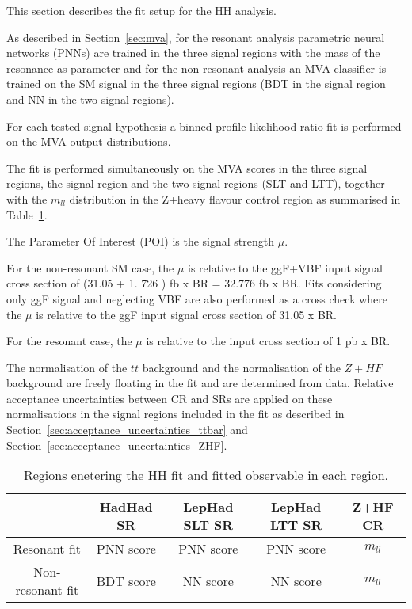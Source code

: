 This section describes the fit setup for the HH analysis.

As described in Section~\ref{sec:mva}, for the resonant analysis parametric neural networks (PNNs) are trained in the three signal regions with the mass of the resonance as parameter and for the non-resonant analysis an MVA classifier is trained on the SM signal in the three signal regions (BDT in the \hadhad signal region and NN in the two \lephad signal regions).  

For each tested signal hypothesis a binned profile likelihood ratio fit is performed on the MVA output distributions.

The fit is performed simultaneously on the MVA scores in the three signal regions, the \hadhad signal region and the two \lephad signal regions (SLT and LTT), together with the $m_{ll}$ distribution in the Z+heavy flavour control region as summarised in Table~\ref{sec:fit:tab:regions}.

The Parameter Of Interest (POI) is the signal strength $\mu$.  

For the non-resonant SM case,  the $\mu$ is relative to the ggF+VBF input signal cross section of (31.05 + 1. 726 ) fb x BR =  32.776 fb x BR.  Fits considering only ggF signal and neglecting VBF are also performed as a cross check where the $\mu$ is relative to the ggF input signal cross section of 31.05 x BR. 

For the resonant case,  the $\mu$  is relative to the input cross section of 1 pb x BR.

The normalisation of the $t\bar{t}$ background and the normalisation of the $Z+HF$ background are freely floating in the fit and are determined from data. %
Relative acceptance uncertainties between CR and SRs are applied on these normalisations in the signal regions included in the fit as described in Section~\ref{sec:acceptance_uncertainties_ttbar} and Section~\ref{sec:acceptance_uncertainties_ZHF}.

\begin{table}
\centering
\begin{tabular}{|c|c|c|c|c|}
\hline
 & HadHad SR & LepHad SLT SR & LepHad LTT SR & Z+HF CR\\
\hline
Resonant fit & PNN score & PNN score & PNN score & $m_{ll}$\\
\hline
Non-resonant fit & BDT score & NN score & NN score & $m_{ll}$\\
\hline
\end{tabular}
\caption{Regions enetering the HH fit and fitted observable in each region.}
\label{sec:fit:tab:regions}
\end{table}

